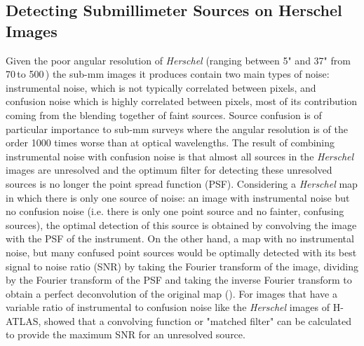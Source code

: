 \subsection{Detecting Submillimeter Sources on Herschel Images}
\label{sec:Detecting Submillimeter Sources on Herschel Images}

Given the poor angular resolution of \textit{Herschel} (ranging between 5" and 37" from 70\,\micron to 500\,\micron) the sub-mm images it produces contain two main types of noise: instrumental noise, which is not typically correlated between pixels, and confusion noise which is highly correlated between pixels, most of its contribution coming from the blending together of faint sources. Source confusion is of particular importance to sub-mm surveys where the angular resolution is of the order 1000 times worse than at optical wavelengths. The result of combining instrumental noise with confusion noise is that almost all sources in the \textit{Herschel} images are unresolved and the optimum filter for detecting these unresolved sources is no longer the point spread function (PSF). Considering a \textit{Herschel} map in which there is only one source of noise: an image with instrumental noise but no confusion noise (i.e. there is only one point source and no fainter, confusing sources), the optimal detection of this source is obtained by convolving the image with the PSF of the instrument. On the other hand, a map with no instrumental noise, but many confused point sources would be optimally detected with its best signal to noise ratio (SNR) by taking the Fourier transform of the image, dividing by the Fourier transform of the PSF and taking the inverse Fourier transform to obtain a perfect deconvolution of the original map (\citealt{Valiante_2016}). For images that have a variable ratio of instrumental to confusion noise like the \textit{Herschel} images of H-ATLAS, \citealt{Chapin_2011} showed that a convolving function or "matched filter" can be calculated to provide the maximum SNR for an unresolved source.

